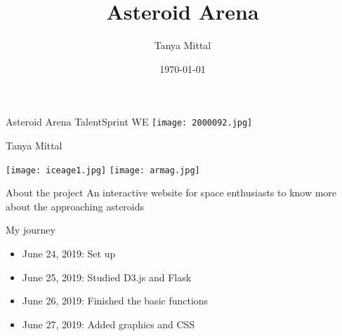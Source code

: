 \documentclass[10pt]{beamer}
\title{Asteroid Arena}
\author{Tanya Mittal}
\date{\today}
\begin{document}
\begin{frame}
\begin{center}
\Huge Asteroid Arena \newline \newline
\small TalentSprint WE\newline \newline
\texttt{[image: 2000092.jpg]} \newline

\Large Tanya Mittal \newline

\end{center}
\end{frame}
    

\begin{frame}
\begin{center}
  \texttt{[image: iceage1.jpg]}
  \texttt{[image: armag.jpg]}
  \end{center}
\end{frame}

\begin{frame}
  \titlepage
\end{frame}



\begin{frame}{About the project}
    An interactive website  for space enthusiasts to know more about the approaching  asteroids
\end{frame}



\begin{frame}{My journey}
\begin{itemize}
   \item June 24, 2019: Set up
  \item June 25, 2019: Studied D3.js and Flask
  \item June 26, 2019: Finished the basic functions
  \item June 27, 2019: Added graphics and CSS
  
  \end{itemize}
\end{frame}
\end{document}
